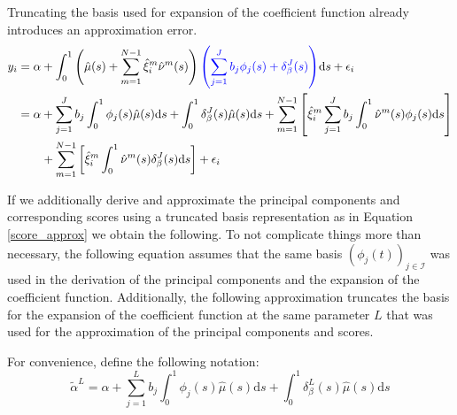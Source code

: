 \documentclass[11pt,twoside,a4paper]{article}
\begin{document}
	Truncating the basis used for expansion of the coefficient function already introduces an approximation error.
	\begin{equation}\label{fpcr_reg_both_expansions}
		\begin{split}
			y_i &= \alpha + \int_{0}^{1} \left(\hat{\mu}(s) + \sum_{m = 1}^{N-1} \hat{\xi}^{m}_i \hat{\nu}^{m}(s)\right) {\color{blue}\left(\sum_{j = 1}^{J} b_j \phi_j(s) + \delta_{\beta}^{J}(s)\right)} \mathrm{d}s + \epsilon_i\\
			&= \alpha + \sum_{j = 1}^{J} b_j \int_{0}^{1} \phi_j(s) \hat{\mu}(s) \mathrm{d}s + \int_{0}^{1} \delta_{\beta}^{J}(s) \hat{\mu}(s) \mathrm{d}s + \sum_{m = 1}^{N-1} \left[ \hat{\xi}^m_i \sum_{j = 1}^{J} b_j \int_{0}^{1}\hat{\nu}^m(s) \phi_j(s) \mathrm{d}s \right] \\
			& \quad \quad + \sum_{m = 1}^{N-1} \left[ \hat{\xi}^m_i \int_{0}^{1}\hat{\nu}^m(s) \delta_{\beta}^{J}(s) \mathrm{d}s \right] + \epsilon_i
		\end{split}
	\end{equation}

	If we additionally derive and approximate the principal components and corresponding scores using a truncated basis representation as in Equation \ref{score_approx} we obtain the following. To not complicate things more than necessary, the following equation assumes that the same basis $\left(\phi_j(t)\right)_{j \in \mathcal{I}}$ was used in the derivation of the principal components and the expansion of the coefficient function. Additionally, the following approximation truncates the basis for the expansion of the coefficient function at the same parameter $L$ that was used for the approximation of the principal components and scores.
	
	For convenience, define the following notation:
	\begin{equation}
		\tilde{\alpha}^L = \alpha + \sum_{j = 1}^{L} b_j \int_{0}^{1} \phi_j(s) \hat{\mu}(s) \mathrm{d}s + \int_{0}^{1} \delta_{\beta}^{L}(s) \hat{\mu}(s) \mathrm{d}s
	\end{equation}
	
\end{document}
